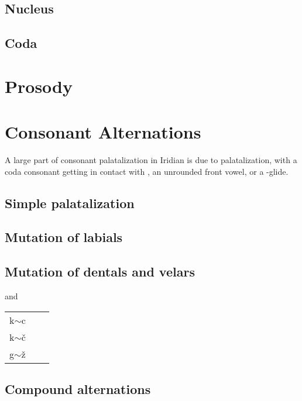 \subsection{Nucleus}

\subsection{Coda}

\section{Prosody}

\section{Consonant Alternations}

A large part of consonant palatalization in Iridian is due to palatalization, with a coda consonant getting in contact with , an unrounded front vowel, or a -glide.

\subsection{Simple palatalization}


\subsection{Mutation of labials}



\subsection{Mutation of dentals and velars}
\pex {} and 
\begin{center}
	\small
	\begin{tabu}to 0.8 \textwidth{Y[0.5]YY}
		k$\sim$c		&  	&  \\
		k$\sim$\v{c}	&&\\
		g$\sim$\v{z}	&&\\
		
	\end{tabu}
\end{center}
\xe

\subsection{Compound alternations}


